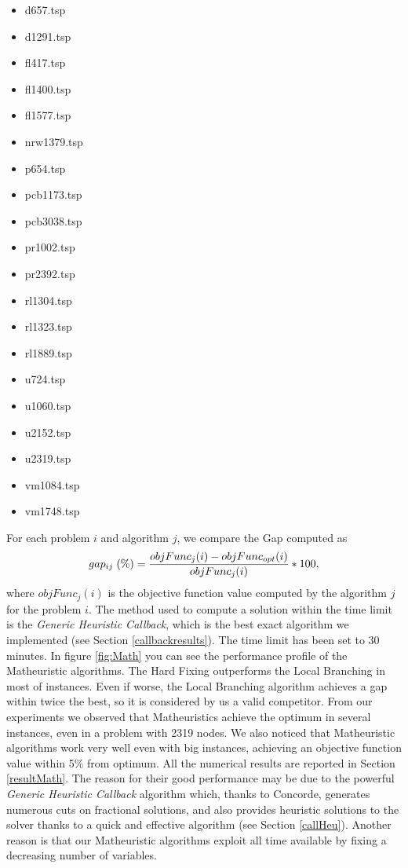 \begin{multicols}{3}
    \begin{itemize}
        \item d657.tsp
        \item d1291.tsp
        \item fl417.tsp
        \item fl1400.tsp
        \item fl1577.tsp
        \item nrw1379.tsp
        \item p654.tsp
        \item pcb1173.tsp
        \item pcb3038.tsp
        \item pr1002.tsp
        \item pr2392.tsp
        \item rl1304.tsp
        \item rl1323.tsp 
        \item rl1889.tsp
        \item u724.tsp
        \item u1060.tsp
        \item u2152.tsp
        \item u2319.tsp
        \item vm1084.tsp
        \item vm1748.tsp
    \end{itemize}
    \end{multicols}
    
\noindent
For each problem $i$ and algorithm $j$, we compare the Gap computed as
\begin{equation}
	gap_{ij} \; (\%) = { objFunc_j(i) - objFunc_{opt}(i) \over objFunc_j(i) } * 100,
\end{equation}
\noindent
where $objFunc_j(i)$ is the objective function value computed by the algorithm $j$ for the problem $i$.
The method used to compute a solution within the time limit is the \textit{Generic Heuristic Callback}, which is the best exact algorithm we implemented (see Section \ref{callbackresults}). The time limit has been set to 30 minutes.
In figure \ref{fig:Math} you can see the performance profile of the Matheuristic algorithms. The Hard Fixing outperforms the Local Branching in most of instances. Even if worse, the Local Branching algorithm achieves a gap within twice the best, so it is considered by us a valid competitor. 
From our experiments we observed that Matheuristics achieve the optimum in several instances, even in a problem with 2319 nodes. We also noticed that Matheuristic algorithms work very well even with big instances, achieving an objective function value within 5\% from optimum. All the numerical results are reported in Section \ref{resultMath}.  
The reason for their good performance may be due to the powerful \textit{Generic Heuristic Callback} algorithm which, thanks to Concorde, generates numerous cuts on fractional solutions, and also provides heuristic solutions to the solver thanks to a quick and effective algorithm (see Section \ref{callHeu}). Another reason is that our Matheuristic algorithms exploit all time available by fixing a decreasing number of variables.

